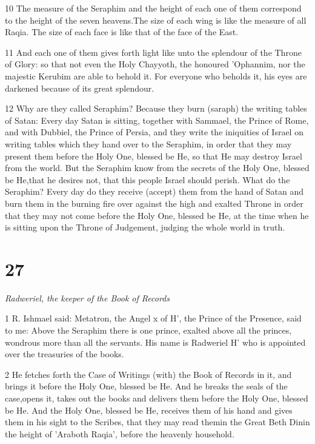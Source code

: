 \par 10 The measure of the Seraphim and the height of each one of them correspond to the height of the seven heavens.The size of each wing is like the measure of all Raqia. The size of each face is like that of the face of the East. 

\par 11 And each one of them gives forth light like unto the splendour of the Throne of Glory: so that not even the Holy Chayyoth, the honoured 'Ophannim, nor the majestic Kerubim are able to behold it. For everyone who beholds it, his eyes are darkened because of its great splendour. 

\par 12 Why are they called Seraphim? Because they burn (saraph) the writing tables of Satan: Every day Satan is sitting, together with Sammael, the Prince of Rome, and with Dubbiel, the Prince of Persia, and they write the iniquities of Israel on writing tables which they hand over to the Seraphim, in order that they may present them before the Holy One, blessed be He, so that He may destroy Israel from the world. But the Seraphim know from the secrets of the Holy One, blessed be He,that he desires not, that this people Israel should perish. What do the Seraphim? Every day do they receive (accept) them from the hand of Satan and burn them in the burning fire over against the high and exalted Throne in order that they may not come before the Holy One, blessed be He, at the time when he is sitting upon the Throne of Judgement, judging the whole world in truth. 



\chapter{27}

\par \textit{Radweriel, the keeper of the Book of Records}

\par 1 R. Ishmael said: Metatron, the Angel x of H', the Prince of the Presence, said to me: Above the Seraphim there is one prince, exalted above all the princes, wondrous more than all the servants. His name is Radweriel H' who is appointed over the treasuries of the books. 

\par 2 He fetches forth the Case of Writings (with) the Book of Records in it, and brings it before the Holy One, blessed be He. And he breaks the seals of the case,opens it, takes out the books and delivers them before the Holy One, blessed be He. And the Holy One, blessed be He, receives them of his hand and gives them in his sight to the Scribes, that they may read themin the Great Beth Dinin the height of 'Araboth Raqia', before the heavenly household. 

